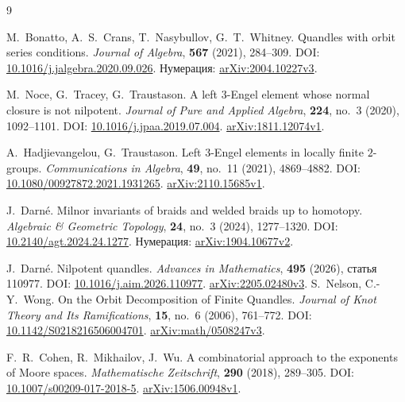 \documentclass[11pt,a4paper]{article}
\theoremstyle{definition}
\theoremstyle{remark}
\begin{document}
\begin{thebibliography}{9}
\small
\raggedright
{}
M.~Bonatto, A.~S.~Crans, T.~Nasybullov, G.~T.~Whitney.
\newblock Quandles with orbit series conditions.
\newblock \emph{Journal of Algebra}, \textbf{567} (2021), 284--309.
\newblock DOI:
\href{https://doi.org/10.1016/j.jalgebra.2020.09.026}{10.1016/j.jalgebra.2020.09.026}.
\newblock Нумерация:
\href{https://arxiv.org/abs/2004.10227v3}{arXiv:2004.10227v3}.

M.~Noce, G.~Tracey, G.~Traustason.
\newblock A left \(3\)-Engel element whose normal closure is not nilpotent.
\newblock \emph{Journal of Pure and Applied Algebra},
\textbf{224}, no.~3 (2020), 1092--1101.
\newblock DOI:
\href{https://doi.org/10.1016/j.jpaa.2019.07.004}{10.1016/j.jpaa.2019.07.004}.
\newblock \href{https://arxiv.org/abs/1811.12074v1}{arXiv:1811.12074v1}.

A.~Hadjievangelou, G.~Traustason.
\newblock Left \(3\)-Engel elements in locally finite \(2\)-groups.
\newblock \emph{Communications in Algebra}, \textbf{49}, no.~11 (2021),
4869--4882.
\newblock DOI:
\href{https://doi.org/10.1080/00927872.2021.1931265}{10.1080/00927872.2021.1931265}.
\newblock \href{https://arxiv.org/abs/2110.15685v1}{arXiv:2110.15685v1}.

J.~Darn\'e.
\newblock Milnor invariants of braids and welded braids up to homotopy.
\newblock \emph{Algebraic \& Geometric Topology},
\textbf{24}, no.~3 (2024), 1277--1320.
\newblock DOI:
\href{https://doi.org/10.2140/agt.2024.24.1277}{10.2140/agt.2024.24.1277}.
\newblock Нумерация:
\href{https://arxiv.org/abs/1904.10677v2}{arXiv:1904.10677v2}.

J.~Darn\'e.
\newblock Nilpotent quandles.
\newblock \emph{Advances in Mathematics}, \textbf{495} (2026), статья 110977.
\newblock DOI:
\href{https://doi.org/10.1016/j.aim.2026.110977}{10.1016/j.aim.2026.110977}.
\newblock \href{https://arxiv.org/abs/2205.02480v3}{arXiv:2205.02480v3}.
S.~Nelson, C.-Y.~Wong.
\newblock On the Orbit Decomposition of Finite Quandles.
\newblock \emph{Journal of Knot Theory and Its Ramifications},
\textbf{15}, no.~6 (2006), 761--772.
\newblock DOI:
\href{https://doi.org/10.1142/S0218216506004701}{10.1142/S0218216506004701}.
\newblock \href{https://arxiv.org/abs/math/0508247v3}{arXiv:math/0508247v3}.

F.~R.~Cohen, R.~Mikhailov, J.~Wu.
\newblock A combinatorial approach to the exponents of Moore spaces.
\newblock \emph{Mathematische Zeitschrift}, \textbf{290} (2018), 289--305.
\newblock DOI:
\href{https://doi.org/10.1007/s00209-017-2018-5}{10.1007/s00209-017-2018-5}.
\newblock \href{https://arxiv.org/abs/1506.00948v1}{arXiv:1506.00948v1}.


\end{thebibliography}
\end{document}
